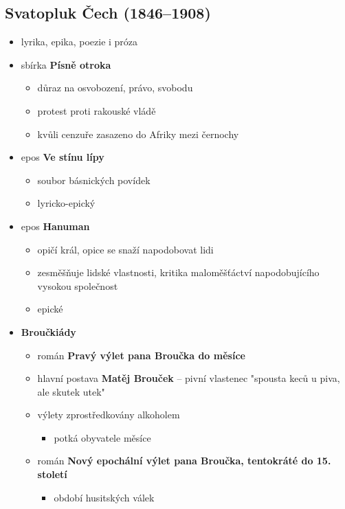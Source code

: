 \subsection{Svatopluk Čech (1846--1908)}
\begin{itemize}
\item lyrika, epika, poezie i próza
\item sbírka \textbf{Písně otroka}
	\begin{itemize}
	\item důraz na osvobození, právo, svobodu
	\item protest proti rakouské vládě
	\item kvůli cenzuře zasazeno do Afriky mezi černochy
	\end{itemize}
\item epos \textbf{Ve stínu lípy}
	\begin{itemize}
	\item soubor básnických povídek
	\item lyricko-epický
	\end{itemize}
\item epos \textbf{Hanuman}
	\begin{itemize}
	\item opičí král, opice se snaží napodobovat lidi
	\item zesměšňuje lidské vlastnosti, kritika maloměšťáctví napodobujícího vysokou společnost
	\item epické
	\end{itemize}		
\item \textbf{Broučkiády}
	\begin{itemize}
	\item román \textbf{Pravý výlet pana Broučka do měsíce}
	\item hlavní postava \textbf{Matěj Brouček} -- pivní vlastenec "spousta keců u piva, ale skutek utek"
	\item výlety zprostředkovány alkoholem
		\begin{itemize}
		\item potká obyvatele měsíce
		\end{itemize}
	\item román \textbf{Nový epochální výlet pana Broučka, tentokráté do 15. století}
		\begin{itemize}
		\item období husitských válek
		\end{itemize}
	\end{itemize}
\end{itemize}

